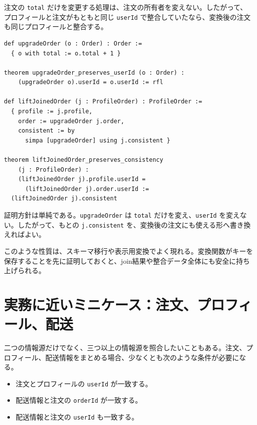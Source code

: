 \begin{softwarebox}
注文の \texttt{total} だけを変更する処理は、注文の所有者を変えない。したがって、プロフィールと注文がもともと同じ \texttt{userId} で整合していたなら、変換後の注文も同じプロフィールと整合する。
\end{softwarebox}

\begin{listing}[htbp]
\begin{verbatim}
def upgradeOrder (o : Order) : Order :=
  { o with total := o.total + 1 }

theorem upgradeOrder_preserves_userId (o : Order) :
    (upgradeOrder o).userId = o.userId := rfl

def liftJoinedOrder (j : ProfileOrder) : ProfileOrder :=
  { profile := j.profile,
    order := upgradeOrder j.order,
    consistent := by
      simpa [upgradeOrder] using j.consistent }

theorem liftJoinedOrder_preserves_consistency
    (j : ProfileOrder) :
    (liftJoinedOrder j).profile.userId =
      (liftJoinedOrder j).order.userId :=
  (liftJoinedOrder j).consistent
\end{verbatim}
\caption{注文変換が整合性を保存すること}
\label{lst:ch17-preserve-consistency}
\end{listing}

証明方針は単純である。\texttt{upgradeOrder} は \texttt{total} だけを変え、\texttt{userId} を変えない。したがって、もとの \texttt{j.consistent} を、変換後の注文にも使える形へ書き換えればよい。

このような性質は、スキーマ移行や表示用変換でよく現れる。変換関数がキーを保存することを先に証明しておくと、join結果や整合データ全体にも安全に持ち上げられる。

\section{実務に近いミニケース：注文、プロフィール、配送}

二つの情報源だけでなく、三つ以上の情報源を照合したいこともある。注文、プロフィール、配送情報をまとめる場合、少なくとも次のような条件が必要になる。

\begin{itemize}
\item 注文とプロフィールの \texttt{userId} が一致する。
\item 配送情報と注文の \texttt{orderId} が一致する。
\item 配送情報と注文の \texttt{userId} も一致する。
\end{itemize}

